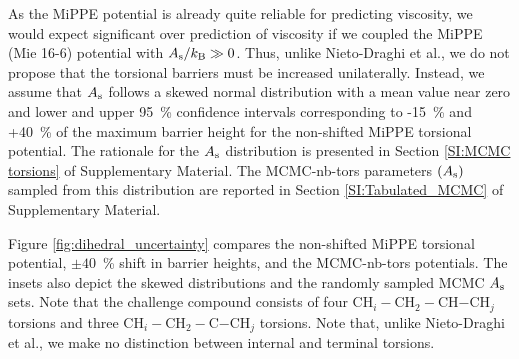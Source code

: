 \documentclass[preprint,review,12pt]{elsarticle}
\begin{document}
	
	As the MiPPE potential is already quite reliable for predicting viscosity, we would expect significant over prediction of viscosity if we coupled the MiPPE (Mie 16-6) potential with $A_{\rm s}/k_{\rm B} \gg 0 $. Thus, unlike Nieto-Draghi et al., we do not propose that the torsional barriers must be increased unilaterally. Instead, we assume that $A_{\rm s}$ follows a skewed normal distribution with a mean value near zero and lower and upper 95~\% confidence intervals corresponding to -15~\% and +40~\% of the maximum barrier height for the non-shifted MiPPE torsional potential. The rationale for the $A_{\rm s}$ distribution is presented in Section \ref{SI:MCMC torsions} of Supplementary Material. The MCMC-nb-tors parameters $(A_{\rm s})$ sampled from this distribution are reported in Section \ref{SI:Tabulated_MCMC} of Supplementary Material.
	
	
	Figure \ref{fig:dihedral_uncertainty} compares the non-shifted MiPPE torsional potential, $\pm 40$~\% shift in barrier heights, and the MCMC-nb-tors potentials. The insets also depict the skewed distributions and the randomly sampled MCMC $A_{\rm s}$ sets. Note that the challenge compound consists of four CH$_i-$CH$_2-$CH$-$CH$_j$ torsions and three CH$_i-$CH$_2-$C$-$CH$_j$ torsions. Note that, unlike Nieto-Draghi et al., we make no distinction between internal and terminal torsions. 
	
	
\end{document}
